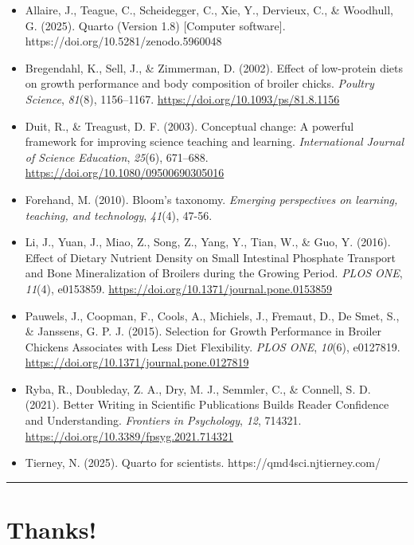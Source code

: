 \documentclass[
  letterpaper,
  DIV=11,
  numbers=noendperiod]{scrartcl}
\begin{document}
\begin{itemize}
\item
  Allaire, J., Teague, C., Scheidegger, C., Xie, Y., Dervieux, C., \&
  Woodhull, G. (2025). Quarto (Version 1.8) {[}Computer software{]}.
  https://doi.org/10.5281/zenodo.5960048
\item
  Bregendahl, K., Sell, J., \& Zimmerman, D. (2002). Effect of
  low-protein diets on growth performance and body composition of
  broiler chicks. \emph{Poultry Science}, \emph{81}(8), 1156--1167.
  \url{https://doi.org/10.1093/ps/81.8.1156}
\item
  Duit, R., \& Treagust, D. F. (2003). Conceptual change: A powerful
  framework for improving science teaching and learning.
  \emph{International Journal of Science Education}, \emph{25}(6),
  671--688. \url{https://doi.org/10.1080/09500690305016}
\item
  Forehand, M. (2010). Bloom's taxonomy. \emph{Emerging perspectives on
  learning, teaching, and technology}, \emph{41}(4), 47-56.
\item
  Li, J., Yuan, J., Miao, Z., Song, Z., Yang, Y., Tian, W., \& Guo, Y.
  (2016). Effect of Dietary Nutrient Density on Small Intestinal
  Phosphate Transport and Bone Mineralization of Broilers during the
  Growing Period. \emph{PLOS ONE}, \emph{11}(4), e0153859.
  \url{https://doi.org/10.1371/journal.pone.0153859}
\item
  Pauwels, J., Coopman, F., Cools, A., Michiels, J., Fremaut, D., De
  Smet, S., \& Janssens, G. P. J. (2015). Selection for Growth
  Performance in Broiler Chickens Associates with Less Diet Flexibility.
  \emph{PLOS ONE}, \emph{10}(6), e0127819.
  \url{https://doi.org/10.1371/journal.pone.0127819}
\item
  Ryba, R., Doubleday, Z. A., Dry, M. J., Semmler, C., \& Connell, S. D.
  (2021). Better Writing in Scientific Publications Builds Reader
  Confidence and Understanding. \emph{Frontiers in Psychology},
  \emph{12}, 714321. \url{https://doi.org/10.3389/fpsyg.2021.714321}
\item
  Tierney, N. (2025). Quarto for scientists.
  https://qmd4sci.njtierney.com/
\end{itemize}

\begin{center}\rule{0.5\linewidth}{0.5pt}\end{center}

\section{\texorpdfstring{Thanks! }{Thanks!  }}\label{thanks}
\end{document}
